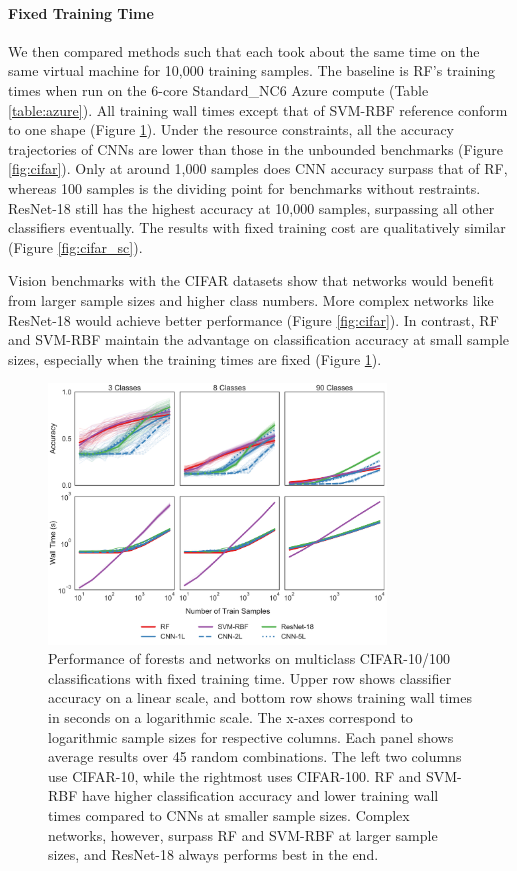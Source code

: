\paragraph{Fixed Training Time}
We then compared methods such that each took about the same time on the same virtual machine for 10,000 training samples. The baseline is RF's training times when run on the 6-core Standard\_NC6 Azure compute (Table \ref{table:azure}).
All training wall times except that of SVM-RBF reference conform to one shape (Figure \ref{fig:cifar_st}). Under the resource constraints, all the accuracy trajectories of CNNs are lower than those in the unbounded benchmarks (Figure \ref{fig:cifar}). Only at around 1,000 samples does CNN accuracy surpass that of RF, whereas 100 samples is the dividing point for benchmarks without restraints. ResNet-18 still has the highest accuracy at 10,000 samples, surpassing all other classifiers eventually. The results with fixed training cost are qualitatively similar (Figure \ref{fig:cifar_sc}).

Vision benchmarks with the CIFAR datasets show that networks would benefit from larger sample sizes and higher class numbers. More complex networks like ResNet-18 would achieve better performance (Figure \ref{fig:cifar}). In contrast, RF and SVM-RBF maintain the advantage on classification accuracy at small sample sizes, especially when the training times are fixed (Figure \ref{fig:cifar_st}). 

\begin{figure}[htb]
\centering
\includegraphics[width=0.8\textwidth]{figures/cifar_st}
  \caption{Performance of forests and networks on multiclass CIFAR-10/100 classifications with fixed training time.
  Upper row shows classifier accuracy on a linear scale, and bottom row shows training wall times in seconds on a logarithmic scale. The x-axes correspond to logarithmic sample sizes for respective columns. Each panel shows average results over 45 random combinations. The left two columns use CIFAR-10, while the rightmost uses CIFAR-100.
  RF and SVM-RBF have higher classification accuracy and lower training wall times compared to CNNs at smaller sample sizes. Complex networks, however, surpass RF and SVM-RBF at larger sample sizes, and ResNet-18 always performs best in the end.
  }
\label{fig:cifar_st}
\end{figure}

